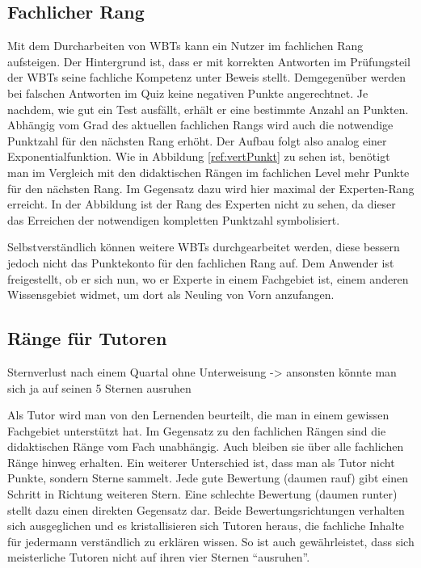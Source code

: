 \subsection{Fachlicher Rang}\label{ref:rankTopic}
Mit dem Durcharbeiten von WBTs kann ein Nutzer im fachlichen Rang aufsteigen.
Der Hintergrund ist, dass er mit korrekten Antworten im Prüfungsteil der WBTs
seine fachliche Kompetenz unter Beweis stellt. Demgegenüber werden bei falschen
Antworten im Quiz keine negativen Punkte angerechtnet. Je nachdem, wie gut ein
Test ausfällt, erhält er eine bestimmte Anzahl an Punkten. Abhängig vom Grad des
aktuellen fachlichen Rangs wird auch die notwendige Punktzahl für den nächsten
Rang erhöht. Der Aufbau folgt also analog einer Exponentialfunktion. Wie in
Abbildung \ref{ref:vertPunkt} zu sehen ist, benötigt man im Vergleich mit den
didaktischen Rängen im fachlichen Level mehr Punkte für den nächsten Rang. Im
Gegensatz dazu wird hier maximal der Experten-Rang erreicht. In der Abbildung
ist der Rang des Experten nicht zu sehen, da dieser das Erreichen der
notwendigen kompletten Punktzahl symbolisiert.

Selbstverständlich können weitere WBTs durchgearbeitet werden, diese bessern
jedoch nicht das Punktekonto für den fachlichen Rang auf. Dem Anwender ist
freigestellt, ob er sich nun, wo er Experte in einem Fachgebiet ist, einem
anderen Wissensgebiet widmet, um dort als Neuling von Vorn anzufangen.

\subsection{Ränge für Tutoren}\label{ref:rankTeach}
\begin{k}
Sternverlust nach einem Quartal ohne Unterweisung -> ansonsten könnte man sich
ja auf seinen 5 Sternen ausruhen
\end{k}
Als Tutor wird man von den Lernenden beurteilt, die man in einem gewissen
Fachgebiet unterstützt hat. Im Gegensatz zu den fachlichen Rängen sind die
didaktischen Ränge vom Fach unabhängig. Auch bleiben sie über alle fachlichen
Ränge hinweg erhalten. Ein weiterer Unterschied ist, dass man als Tutor nicht
Punkte, sondern Sterne sammelt. Jede gute Bewertung (daumen rauf) gibt einen
Schritt in Richtung weiteren Stern. Eine schlechte Bewertung (daumen runter)
stellt dazu einen direkten Gegensatz dar. Beide Bewertungsrichtungen verhalten
sich ausgeglichen und es kristallisieren sich Tutoren heraus, die fachliche
Inhalte für jedermann verständlich zu erklären wissen. So ist auch
gewährleistet, dass sich meisterliche Tutoren nicht auf ihren vier Sternen
"`ausruhen"'. 

